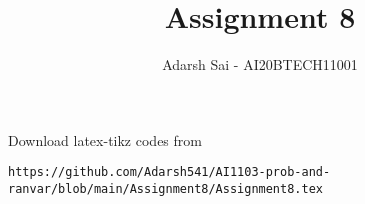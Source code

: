 \documentclass[journal,12pt,twocolumn]{IEEEtran}
\DeclareMathOperator*{\Res}{Res}
\begin{document}
\newcommand{\BEQA}{\begin{eqnarray}}
\newcommand{\EEQA}{\end{eqnarray}}
\newcommand{\define}{\stackrel{\triangle}{=}}

\raggedbottom
\setlength{\parindent}{0pt}
\providecommand{\mbf}{\mathbf}
\providecommand{\pr}[1]{\ensuremath{\Pr\left(#1\right)}}
\providecommand{\qfunc}[1]{\ensuremath{Q\left(#1\right)}}
\providecommand{\sbrak}[1]{\ensuremath{{}\left[#1\right]}}
\providecommand{\lsbrak}[1]{\ensuremath{{}\left[#1\right.}}
\providecommand{\rsbrak}[1]{\ensuremath{{}\left.#1\right]}}
\providecommand{\brak}[1]{\ensuremath{\left(#1\right)}}
\providecommand{\lbrak}[1]{\ensuremath{\left(#1\right.}}
\providecommand{\rbrak}[1]{\ensuremath{\left.#1\right)}}
\providecommand{\cbrak}[1]{\ensuremath{\left\{#1\right\}}}
\providecommand{\lcbrak}[1]{\ensuremath{\left\{#1\right.}}
\providecommand{\rcbrak}[1]{\ensuremath{\left.#1\right\}}}
\theoremstyle{remark}
\newtheorem{rem}{Remark}
\newcommand{\sgn}{\mathop{\mathrm{sgn}}}
\providecommand{\abs}[1]{\vert#1\vert}
\providecommand{\res}[1]{\Res\displaylimits_{#1}} 
\providecommand{\norm}[1]{\lVert#1\rVert}
\providecommand{\mtx}[1]{\mathbf{#1}}
\providecommand{\mean}[1]{E[ #1 ]}
\providecommand{\fourier}{\overset{\mathcal{F}}{ \rightleftharpoons}}
\providecommand{\system}{\overset{\mathcal{H}}{ \longleftrightarrow}}
\newcommand{\solution}{\noindent \textbf{Solution: }}
\newcommand{\cosec}{\,\text{cosec}\,}
\providecommand{\dec}[2]{\ensuremath{\overset{#1}{\underset{#2}{\gtrless}}}}
\newcommand{\myvec}[1]{\ensuremath{\begin{pmatrix}#1\end{pmatrix}}}
\newcommand{\mydet}[1]{\ensuremath{\begin{vmatrix}#1\end{vmatrix}}}
\makeatletter
{}
\makeatother
\let\StandardTheFigure\thefigure
\let\vec\mathbf
\renewcommand{\thefigure}{\theproblem}
\def\putbox#1#2#3{\makebox[0in][l]{\makebox[#1][l]{}\raisebox{\baselineskip}[0in][0in]{\raisebox{#2}[0in][0in]{#3}}}}
     \def\rightbox#1{\makebox[0in][r]{#1}}
     \def\centbox#1{\makebox[0in]{#1}}
     \def\topbox#1{\raisebox{-\baselineskip}[0in][0in]{#1}}
     \def\midbox#1{\raisebox{-0.5\baselineskip}[0in][0in]{#1}}
\vspace{3cm}
\title{Assignment 8}
\author{Adarsh Sai - AI20BTECH11001}
\maketitle
\newpage
\bigskip
\renewcommand{\thefigure}{\theenumi}
\renewcommand{\thetable}{\theenumi}
%
Download latex-tikz codes from 
%
\begin{lstlisting}
https://github.com/Adarsh541/AI1103-prob-and-ranvar/blob/main/Assignment8/Assignment8.tex
\end{lstlisting}
\end{document}
